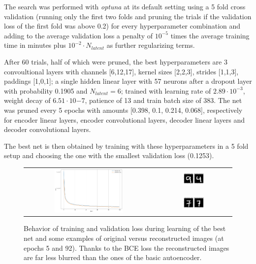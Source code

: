 \documentclass[a4paper, 11pt]{article}
\begin{document}
    The search was performed with \emph{optuna} at its default setting using a 5 fold cross validation (running only the first two folds and pruning the trials if the validation loss of the first fold was above 0.2) for every hyperparameter combination and adding to the average validation loss a penalty of $10^{-5}$ times the average training time in minutes plus $10^{-2} \cdot N_{latent}$ as further regularizing terms.

    After 60 trials, half of which were pruned, the best hyperparameters are 3 convoultional layers with channels [6,12,17], kernel sizes [2,2,3], strides [1,1,3], paddings [1,0,1]; a single hidden linear layer with 57 neurons after a dropout layer with probability 0.1905 and $N_{latent} = 6$; trained with learning rate of $2.89\cdot10^{-3}$, weight decay of $6.51\cdot10{-7}$, patience of 13 and train batch size of 383. The net was pruned every 5 epochs with amounts [0.398, 0.1, 0.214, 0.068], respectively for encoder linear layers, encoder convolutional layers, decoder linear layers and decoder convolutional layers.

    The best net is then obtained by training with these hyperparameters in a 5 fold setup and choosing the one with the smallest validation loss (0.1253).

    \begin{figure}
      \centering
      \begin{tabular}{cc}
        \multirow{2}{*}[2.4cm]{\includegraphics[width=0.55\textwidth]{img/best_loss.png}}
        & \includegraphics[width=0.3\textwidth]{img/best/epoch_5.png} \\
        & \includegraphics[width=0.3\textwidth]{img/best/epoch_92.png} \\
      \end{tabular}
      \caption{Behavior of training and validation loss during learning of the best net and some examples of original versus reconstructed images (at epochs 5 and 92). Thanks to the BCE loss the reconstructed images are far less blurred than the ones of the basic autoencoder.}
      \label{fig:best}
    \end{figure}
\end{document}
